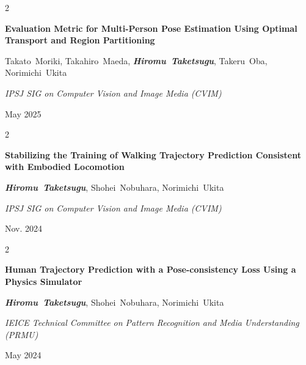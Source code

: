 \documentclass[10pt, letterpaper]{article}
\newenvironment{twocolentry}[2][]{
    \onecolentry
    \def\secondColumn{#2}
    \setcolumnwidth{\fill, 4.5 cm}
    \begin{paracol}{2}
}{
    \switchcolumn \raggedleft \secondColumn
    \end{paracol}
    \endonecolentry
} %
\begin{document}
        \vspace{0.2 cm}

        \begin{samepage}
            \begin{twocolentry}{
                May 2025
            }
                \textbf{Evaluation Metric for Multi-Person Pose Estimation Using Optimal Transport and Region Partitioning}

                \vspace{0.10 cm}

                \mbox{Takato Moriki}, \mbox{Takahiro Maeda}, \mbox{\textbf{\textit{Hiromu Taketsugu}}}, \mbox{Takeru Oba}, \mbox{Norimichi Ukita}
                \vspace{0.10 cm}

                \textit{IPSJ SIG on Computer Vision and Image Media (CVIM)}
            \end{twocolentry}
        \end{samepage}

        \vspace{0.2 cm}

        \begin{samepage}
            \begin{twocolentry}{
                Nov. 2024
            }
                \textbf{Stabilizing the Training of Walking Trajectory Prediction Consistent with Embodied Locomotion}

                \vspace{0.10 cm}

                \mbox{\textbf{\textit{Hiromu Taketsugu}}}, \mbox{Shohei Nobuhara}, \mbox{Norimichi Ukita}
                \vspace{0.10 cm}

                \textit{IPSJ SIG on Computer Vision and Image Media (CVIM)}
            \end{twocolentry}
        \end{samepage}

        \vspace{0.2 cm}

        \begin{samepage}
            \begin{twocolentry}{
                May 2024
            }
                \textbf{Human Trajectory Prediction with a Pose-consistency Loss Using a Physics Simulator}

                \vspace{0.10 cm}

                \mbox{\textbf{\textit{Hiromu Taketsugu}}}, \mbox{Shohei Nobuhara}, \mbox{Norimichi Ukita}
                \vspace{0.10 cm}

                \textit{IEICE Technical Committee on Pattern Recognition and Media Understanding (PRMU)}
            \end{twocolentry}
        \end{samepage}
\end{document}
